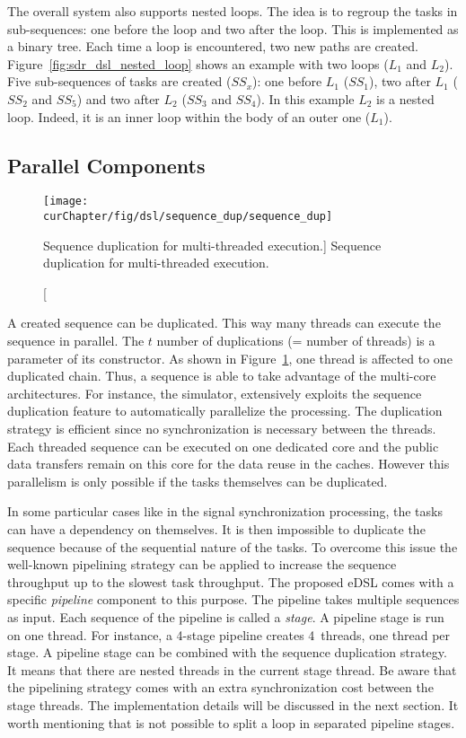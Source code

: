 The overall system also supports nested loops. The idea is to regroup the tasks
in sub-sequences: one before the loop and two after the loop. This is
implemented as a binary tree. Each time a loop is encountered, two new paths are
created. Figure~\ref{fig:sdr_dsl_nested_loop} shows an example with two loops
($L_1$ and $L_2$). Five sub-sequences of tasks are created ($SS_x$): one before
$L_1$ ($SS_1$), two after $L_1$ ($SS_2$ and $SS_5$) and two after $L_2$ ($SS_3$
and $SS_4$). In this example $L_2$ is a nested loop. Indeed, it is an inner loop
within the body of an outer one ($L_1$).

\subsection{Parallel Components}

\begin{figure}[htp]
  \centering
  \texttt{[image: \\curChapter/fig/dsl/sequence\_dup/sequence\_dup]}
  \caption
    [Sequence duplication for multi-threaded execution.]
    {Sequence duplication for multi-threaded execution.}
  \label{fig:sdr_dsl_sequence_dup}
\end{figure}

A created sequence can be duplicated. This way many threads can execute the
sequence in parallel. The $t$ number of duplications (= number of threads) is a
parameter of its constructor. As shown in Figure~\ref{fig:sdr_dsl_sequence_dup},
one thread is affected to one duplicated chain. Thus, a sequence is able to take
advantage of the multi-core architectures. For instance, the \AFFECT simulator,
extensively exploits the sequence duplication feature to automatically
parallelize the processing. The duplication strategy is efficient since no
synchronization is necessary between the threads. Each threaded sequence can
be executed on one dedicated core and the public data transfers remain on this
core for the data reuse in the caches. However this parallelism is only possible
if the tasks themselves can be duplicated.

In some particular cases like in the signal synchronization processing, the
tasks can have a dependency on themselves. It is then impossible to duplicate
the sequence because of the sequential nature of the tasks. To overcome this
issue the well-known pipelining strategy can be applied to increase the sequence
throughput up to the slowest task throughput. The proposed eDSL comes with a
specific \emph{pipeline} component to this purpose. The pipeline takes multiple
sequences as input. Each sequence of the pipeline is called a \emph{stage}. A
pipeline stage is run on one thread. For instance, a 4-stage pipeline creates
4~threads, one thread per stage. A pipeline stage can be combined with the
sequence duplication strategy. It means that there are nested threads in the
current stage thread. Be aware that the pipelining strategy comes with an extra
synchronization cost between the stage threads. The implementation details will
be discussed in the next section. It worth mentioning that is not possible to
split a loop in separated pipeline stages.

